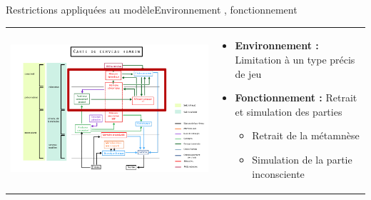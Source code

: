 \begin{frame}{Restrictions appliquées au modèle}{Environnement , fonctionnement}
\begin{tabular}{l l}
\begin{minipage}{0.6\textwidth}\begin{centre}
\includegraphics[width=\textwidth]{img/analyse_generale/modele_restraint}
\end{centre}\end{minipage} & \begin{minipage}{0.4\textwidth}
\begin{itemize}
  \item \textbf{Environnement : }Limitation à un type précis de jeu
  \item \textbf{Fonctionnement : }Retrait et simulation des parties
  \begin{itemize}
    \item Retrait de la métamnèse
    \item Simulation de la partie inconsciente
  \end{itemize}
\end{itemize}
\end{minipage}
\end{tabular}
\end{frame}
